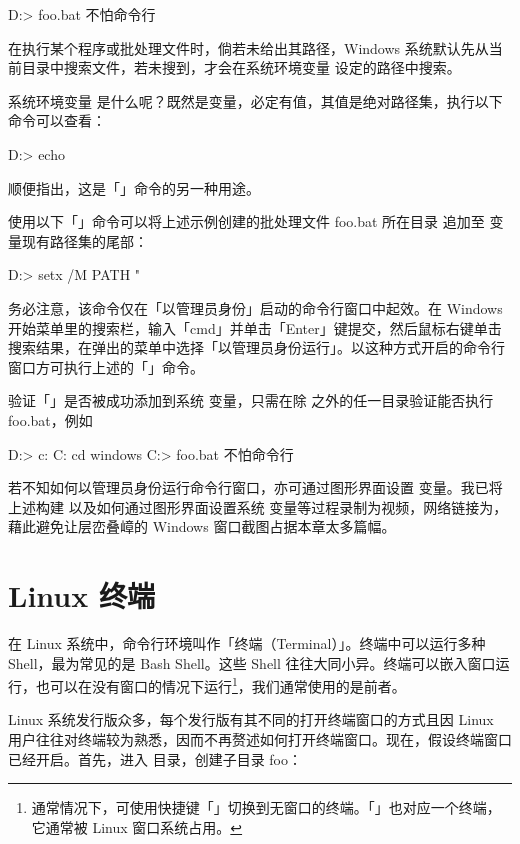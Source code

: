 {{{{\starttyping
D:\foo> foo.bat
不怕命令行
\stoptyping

\noindent 在执行某个程序或批处理文件时，倘若未给出其路径，Windows 系统默认先从当前目录中搜索文件，若未搜到，才会在系统环境变量  设定的路径中搜索。

系统环境变量  是什么呢？既然是变量，必定有值，其值是绝对路径集，执行以下命令可以查看：

\starttyping
D:\foo> echo %
\stoptyping

\noindent 顺便指出，这是「」命令的另一种用途。

使用以下「」命令可以将上述示例创建的批处理文件 foo.bat 所在目录  追加至  变量现有路径集的尾部：

\starttyping
D:\foo> setx /M PATH "%
\stoptyping

\noindent 务必注意，该命令仅在「以管理员身份」启动的命令行窗口中起效。在 Windows 开始菜单里的搜索栏，输入「cmd」并单击「Enter」键提交，然后鼠标右键单击搜索结果，在弹出的菜单中选择「以管理员身份运行」。以这种方式开启的命令行窗口方可执行上述的「」命令。

验证「」是否被成功添加到系统  变量，只需在除  之外的任一目录验证能否执行 foo.bat，例如

\starttyping
D:\foo> c:
C:\> cd windows  
C:\Windows{}> foo.bat
不怕命令行  
\stoptyping

若不知如何以管理员身份运行命令行窗口，亦可通过图形界面设置  变量。我已将上述构建  以及如何通过图形界面设置系统  变量等过程录制为视频，网络链接为，藉此避免让层峦叠嶂的 Windows 窗口截图占据本章太多篇幅。

\section{Linux 终端}

在 Linux 系统中，命令行环境叫作「终端（Terminal）」。终端中可以运行多种 Shell，最为常见的是 Bash Shell。这些 Shell 往往大同小异。终端可以嵌入窗口运行，也可以在没有窗口的情况下运行\footnote{通常情况下，可使用快捷键「」切换到无窗口的终端。「」也对应一个终端，它通常被 Linux 窗口系统占用。}，我们通常使用的是前者。

Linux 系统发行版众多，每个发行版有其不同的打开终端窗口的方式且因 Linux 用户往往对终端较为熟悉，因而不再赘述如何打开终端窗口。现在，假设终端窗口已经开启。首先，进入  目录，创建子目录 foo：

}}}}
